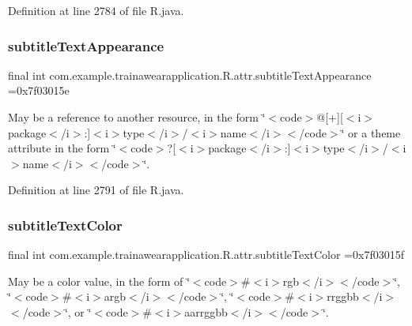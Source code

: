 Definition at line 2784 of file R.\+java.

\mbox{\label{classcom_1_1example_1_1trainawearapplication_1_1_r_1_1attr_ab1508058707d05dedc414da835bb5bef}} 
\subsubsection{\texorpdfstring{subtitleTextAppearance}{subtitleTextAppearance}}
{\footnotesize\ttfamily final int com.\+example.\+trainawearapplication.\+R.\+attr.\+subtitle\+Text\+Appearance =0x7f03015e\hspace{0.3cm}{\ttfamily [static]}}

May be a reference to another resource, in the form \char`\"{}$<$code$>$@\mbox{[}+\mbox{]}\mbox{[}$<$i$>$package$<$/i$>$\+:\mbox{]}$<$i$>$type$<$/i$>$/$<$i$>$name$<$/i$>$$<$/code$>$\char`\"{} or a theme attribute in the form \char`\"{}$<$code$>$?\mbox{[}$<$i$>$package$<$/i$>$\+:\mbox{]}$<$i$>$type$<$/i$>$/$<$i$>$name$<$/i$>$$<$/code$>$\char`\"{}. 

Definition at line 2791 of file R.\+java.

\mbox{\label{classcom_1_1example_1_1trainawearapplication_1_1_r_1_1attr_a214c54ff67d3c203268ac8ebbd5af3ac}} 
\subsubsection{\texorpdfstring{subtitleTextColor}{subtitleTextColor}}
{\footnotesize\ttfamily final int com.\+example.\+trainawearapplication.\+R.\+attr.\+subtitle\+Text\+Color =0x7f03015f\hspace{0.3cm}{\ttfamily [static]}}

May be a color value, in the form of \char`\"{}$<$code$>$\#$<$i$>$rgb$<$/i$>$$<$/code$>$\char`\"{}, \char`\"{}$<$code$>$\#$<$i$>$argb$<$/i$>$$<$/code$>$\char`\"{}, \char`\"{}$<$code$>$\#$<$i$>$rrggbb$<$/i$>$$<$/code$>$\char`\"{}, or \char`\"{}$<$code$>$\#$<$i$>$aarrggbb$<$/i$>$$<$/code$>$\char`\"{}. 

